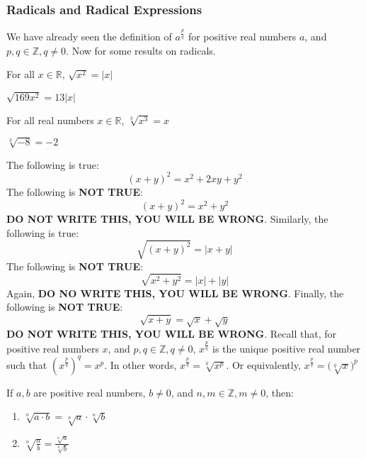         \subsubsection{Radicals and Radical Expressions}
        We have already seen the definition of $a^{\frac{p}{q}}$ for positive real numbers $a$, and $p,q\in \mathbb{Z}, q\ne 0$. Now for some results on radicals.
        \begin{theorem}
        For all $x\in \mathbb{R}$, $\sqrt{x^2} = |x|$
        \end{theorem}
        \begin{example}
        $\sqrt{169x^2} = 13|x|$
        \end{example}
        \begin{theorem}
        For all real numbers $x\in \mathbb{R}$, $\sqrt[3]{x^3} = x$
        \end{theorem}
        \begin{example}
        $\sqrt[3]{-8} = -2$
        \end{example}
        The following is true:
        \begin{equation}
        \nonumber (x+y)^2 = x^2+2xy+y^2
        \end{equation}
        The following is \textbf{NOT TRUE}:
        \begin{equation}
        \nonumber (x+y)^2 = x^2 + y^2
        \end{equation}
        \textbf{DO NOT WRITE THIS, YOU WILL BE WRONG}.
        Similarly, the following is true:
        \begin{equation}
        \nonumber \sqrt{(x+y)^2} = |x+y|
        \end{equation}
        The following is \textbf{NOT TRUE}:
        \begin{equation}
        \nonumber \sqrt{x^2+y^2} = |x|+|y|
        \end{equation}
        Again, \textbf{DO NO WRITE THIS, YOU WILL BE WRONG}.
        Finally, the following is \textbf{NOT TRUE}:
        \begin{equation}
        \nonumber \sqrt{x+y} = \sqrt{x}+\sqrt{y}
        \end{equation}
        \textbf{DO NOT WRITE THIS, YOU WILL BE WRONG}.
        Recall that, for positive real numbers $x$, and $p,q\in \mathbb{Z},q\ne 0$, $x^{\frac{p}{q}}$ is the unique positive real number such that $(x^{\frac{p}{q}})^q = x^p$. In other words, $x^{\frac{p}{q}}=\sqrt[q]{x^p}$. Or equivalently, $x^{\frac{p}{q}} = \big(\sqrt[q]{x}\big)^p$
        \begin{properties}
        If $a,b$ are positive real numbers, $b\ne0$, and $n,m\in \mathbb{Z}, m\ne 0$, then:
        \begin{enumerate}
        \item $\sqrt[n]{a\cdot b} = \sqrt[n]{a}\cdot \sqrt[n]{b}$
        \item $\sqrt[n]{\frac{a}{b}} = \frac{\sqrt[n]{a}}{\sqrt[n]{b}}$
        \end{enumerate}
        \end{properties}
